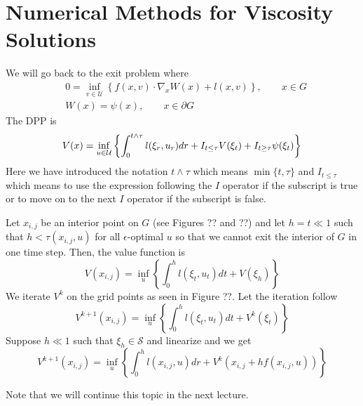 \section{Numerical Methods for Viscosity Solutions}
We will go back to the exit problem where
\begin{align*}
&0 = \inf_{v\in\mathcal{U}}\left\lbrace f(x,v)\cdot\nabla_xW(x)+l(x,v)\right\rbrace, \qquad x\in G \\
&W(x) = \psi(x), \qquad x\in\partial G
\end{align*}
The DPP is
$$V(x) = \inf_{u\in\mathcal{U}}\left\lbrace \int_0^{t\wedge\tau}l(\xi_r,u_r)dr + I_{t\leq\tau}V(\xi_t) + I_{t\geq\tau}\psi(\xi_t)\right\rbrace$$
Here we have introduced the notation $t\wedge\tau$ which means $\min\{t,\tau\}$ and $I_{t\leq\tau}$ which means to use the expression following the $I$ operator if the subscript is true or to move on to the next $I$ operator if the subscript is false.

Let $x_{i,j}$ be an interior point on $G$ (see Figures ?? and ??) and let $h=t\ll 1$ such that $h<\tau(x_{i,j},u)$ for all $\epsilon$-optimal $u$ so that we cannot exit the interior of $G$ in one time step. Then, the value function is
$$V(x_{i,j}) = \inf_u\left\lbrace \int_0^hl(\xi_t,u_t)dt+V(\xi_h)\right\rbrace$$
We iterate $V^k$ on the grid points as seen in Figure ??. Let the iteration follow
$$V^{k+1}(x_{i,j}) = \inf_u\left\lbrace \int_0^hl(\xi_t,u_t)dt + V^k(\xi_t)\right\rbrace$$
Suppose $h\ll 1$ such that $\xi_h\in\mathcal{S}$ and linearize and we get
$$V^{k+1}(x_{i,j}) = \inf_u\left\lbrace \int_0^h l(x_{i,j},u)dr+V^k(x_{i,j}+hf(x_{i,j},u))\right\rbrace$$

Note that we will continue this topic in the next lecture.

